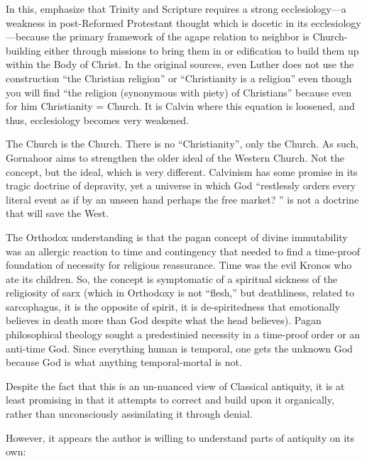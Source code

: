 \begin{quotex}
In this, emphasize that Trinity and Scripture requires a strong ecclesiology---a weakness in post-Reformed Protestant thought which is docetic in its ecclesiology---because the primary framework of the agape relation to neighbor is Church-building either through missions to bring them in or edification to build them up within the Body of Christ. In the original sources, even Luther does not use the construction ``the Christian religion'' or ``Christianity is a religion'' even though you will find ``the religion (synonymous with piety) of Christians'' because even for him Christianity = Church. It is Calvin where this equation is loosened, and thus, ecclesiology becomes very weakened.
\end{quotex}

The Church is the Church. There is no ``Christianity'', only the Church. As such, Gornahoor aims to strengthen the older ideal of the Western Church. Not the concept, but the ideal, which is very different. Calvinism has some promise in its tragic doctrine of depravity, yet a universe in which God ``restlessly orders every literal event as if by an unseen hand perhaps the free market? '' is not a doctrine that will save the West.

\begin{quotex}
The Orthodox understanding is that the pagan concept of divine immutability was an allergic reaction to time and contingency that needed to find a time-proof foundation of necessity for religious reassurance. Time was the evil Kronos who ate its children. So, the concept is symptomatic of a spiritual sickness of the religiosity of sarx (which in Orthodoxy is not ``flesh,'' but deathliness, related to sarcophagus, it is the opposite of spirit, it is de-spiritedness that emotionally believes in death more than God despite what the head believes). Pagan philosophical theology sought a predestinied necessity in a time-proof order or an anti-time God. Since everything human is temporal, one gets the unknown God because God is what anything temporal-mortal is not.
\end{quotex}


Despite the fact that this is an un-nuanced view of Classical antiquity, it is at least promising in that it attempts to correct and build upon it organically, rather than unconsciously assimilating it through denial.

However, it appears the author is willing to understand parts of antiquity on its own:

